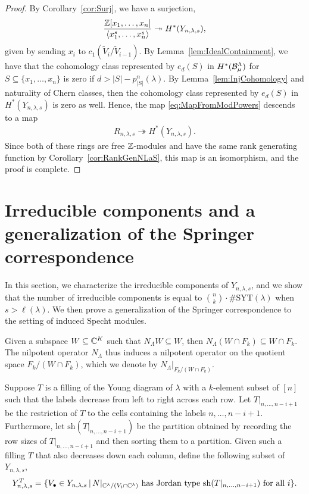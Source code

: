 \documentclass[12pt]{amsart}
\newcommand{\st}{\,|\,}
\newcommand{\la}{\lambda}
\newcommand{\SYT}{\mathrm{SYT}}
\begin{document}
\begin{proof}
By Corollary~\ref{cor:Surj}, we have a surjection,
\begin{align}\label{eq:MapFromModPowers}
\frac{\bZ[x_1,\dots, x_n]}{\langle x_1^s,\dots, x_n^s\rangle} \twoheadrightarrow H^*(Y_{n,\la,s}),
\end{align}
given by sending $x_i$ to $c_1(\widetilde V_i/\widetilde V_{i-1})$. By Lemma~\ref{lem:IdealContainment}, we have that the cohomology class represented by $e_d(S)$ in $H^*(\mathcal{B}_\mu^\Lambda)$ for $S\subseteq \{x_1,\dots, x_n\}$ is zero if $d>|S| - p^n_{|S|}(\la)$. By Lemma~\ref{lem:InjCohomology} and naturality of Chern classes, then the cohomology class represented by $e_d(S)$ in $H^*(Y_{n,\la,s})$ is zero as well. Hence, the map \eqref{eq:MapFromModPowers} descends to a map
\begin{align}
R_{n,\la,s} \twoheadrightarrow H^*(Y_{n,\la,s}).
\end{align}
Since both of these rings are free $\mathbb{Z}$-modules and have the same rank generating function by Corollary~\ref{cor:RankGenNLaS}, this map is an isomorphism, and the proof is complete.
\end{proof}





\section{Irreducible components and a generalization of the Springer correspondence}\label{sec:IrreducibleComponents}


In this section, we characterize the irreducible components of $Y_{n,\la,s}$, and we show that the number of irreducible components is equal to $\binom{n}{k}\cdot\#\SYT(\la)$ when $s>\ell(\la)$. We then prove a generalization of the Springer correspondence to the setting of induced Specht modules.


Given a subspace $W\subseteq \mathbb{C}^K$ such that $N_\Lambda W\subseteq W$, then $N_\Lambda(W\cap F_k)\subseteq W\cap F_k$. The nilpotent operator $N_\Lambda$ thus induces a nilpotent operator on the quotient space $F_k/(W\cap F_k)$, which we denote by $N_\Lambda|_{F_k/(W\cap F_k)}$.

Suppose $T$ is a filling of the Young diagram of $\lambda$ with a $k$-element subset of $[n]$ such that the labels decrease from left to right across each row. Let $T|_{n,\dots, n-i+1}$ be the restriction of $T$ to the cells containing the labels $n,\dots, n-i+1$. Furthermore, let $\mathrm{sh}(T|_{n,\dots, n-i+1})$ be the partition obtained by recording the row sizes of $T|_{n,\dots, n-i+1}$ and then sorting them to a partition.
Given such a filling $T$ that also decreases down each column, define the following subset of $Y_{n,\la,s}$,
\begin{align}
Y_{n,\la,s}^{T} = \{V_\bullet \in Y_{n,\la,s} \st N|_{\bC^\lambda/(V_i\cap \bC^\lambda)}\text{ has Jordan type }\mathrm{sh}(T|_{n,\dots,n-i+1})\text{ for all }i\}.
\end{align}
\end{document}
